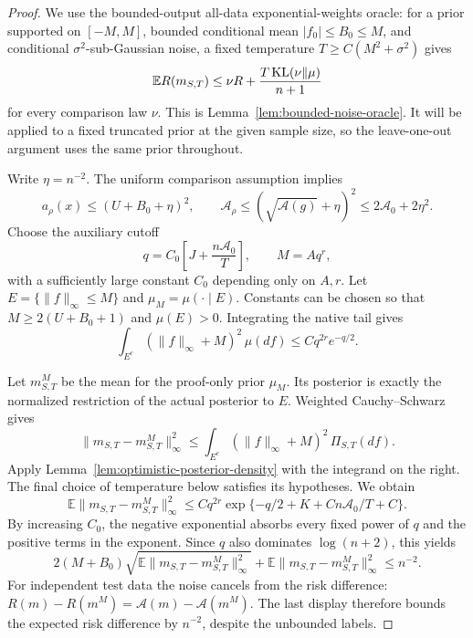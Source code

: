 \begin{proof}
We use the bounded-output all-data exponential-weights oracle: for a prior supported on $[-M,M]$, bounded conditional mean $|f_0|\le B_0\le M$, and conditional $\sigma^2$-sub-Gaussian noise, a fixed temperature $T\ge C(M^2+\sigma^2)$ gives
\begin{equation}
 \mathbb E R(m_{S,T})\le\nu R+\frac{T\operatorname{KL}(\nu\|\mu)}{n+1}
 \label{eq:optimistic-bounded-oracle}
\end{equation}
for every comparison law $\nu$. This is Lemma~\ref{lem:bounded-noise-oracle}. It will be applied to a fixed truncated prior at the given sample size, so the leave-one-out argument uses the same prior throughout.

Write $\eta=n^{-2}$. The uniform comparison assumption implies
\[
 a_\rho(x)\le(U+B_0+\eta)^2,
 \qquad
 \mathcal A_\rho\le(\sqrt{\mathcal A(g)}+\eta)^2
                        \le2\mathcal A_0+2\eta^2.
\]
Choose the auxiliary cutoff
\[
 q=C_0\left[J+\frac{n\mathcal A_0}T\right],\qquad M=Aq^r,
\]
with a sufficiently large constant $C_0$ depending only on $A,r$. Let $E=\{\|f\|_\infty\le M\}$ and $\mu_M=\mu(\cdot\mid E)$. Constants can be chosen so that $M\ge2(U+B_0+1)$ and $\mu(E)>0$. Integrating the native tail gives
\begin{equation}
 \int_{E^c}(\|f\|_\infty+M)^2\,\mu(df)
                  \le C q^{2r}e^{-q/2}.
 \label{eq:optimistic-tail-second-moment}
\end{equation}

Let $m^M_{S,T}$ be the mean for the proof-only prior $\mu_M$. Its posterior is exactly the normalized restriction of the actual posterior to $E$. Weighted Cauchy--Schwarz gives
\[
 \|m_{S,T}-m^M_{S,T}\|_\infty^2
 \le \int_{E^c}(\|f\|_\infty+M)^2\,\Pi_{S,T}(df).
\]
Apply Lemma~\ref{lem:optimistic-posterior-density} with the integrand on the right. The final choice of temperature below satisfies its hypotheses. We obtain
\[
 \mathbb E\|m_{S,T}-m^M_{S,T}\|_\infty^2
 \le Cq^{2r}\exp\{-q/2+K+C n\mathcal A_0/T+C\}.
\]
By increasing $C_0$, the negative exponential absorbs every fixed power of $q$ and the positive terms in the exponent. Since $q$ also dominates $\log(n+2)$, this yields
\[
 2(M+B_0)\sqrt{\mathbb E\|m_{S,T}-m^M_{S,T}\|_\infty^2}
       +\mathbb E\|m_{S,T}-m^M_{S,T}\|_\infty^2
 \le n^{-2}.
\]
For independent test data the noise cancels from the risk difference:
$R(m)-R(m^M)=\mathcal A(m)-\mathcal A(m^M)$.
The last display therefore bounds the expected risk difference by $n^{-2}$, despite the unbounded labels.


\end{proof}
